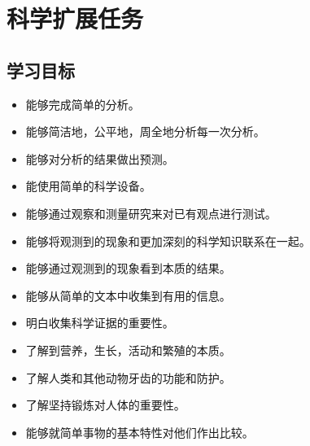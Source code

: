 \chapter{科学扩展任务}

\section{学习目标}
     \begin{itemize}
      \item 能够完成简单的分析。
      \item 能够简洁地，公平地，周全地分析每一次分析。 
      \item 能够对分析的结果做出预测。
      \item 能使用简单的科学设备。
      \item 能够通过观察和测量研究来对已有观点进行测试。
      \item 能够将观测到的现象和更加深刻的科学知识联系在一起。
      \item 能够通过观测到的现象看到本质的结果。
      \item 能够从简单的文本中收集到有用的信息。
      \item 明白收集科学证据的重要性。
      \item 了解到营养，生长，活动和繁殖的本质。
      \item 了解人类和其他动物牙齿的功能和防护。
      \item 了解坚持锻炼对人体的重要性。
      \item 能够就简单事物的基本特性对他们作出比较。
   \end{itemize}  

